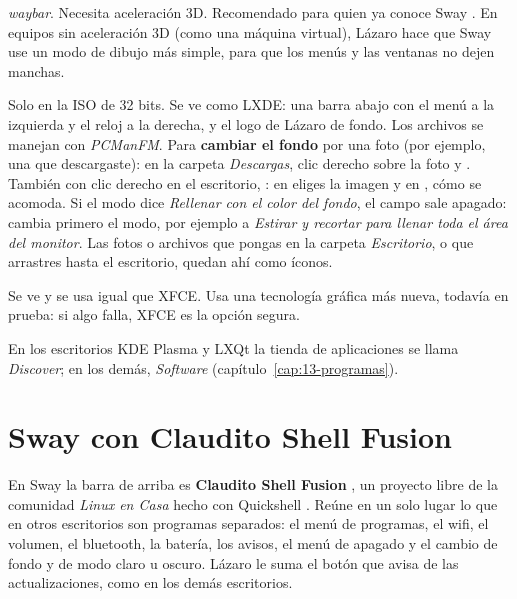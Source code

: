 \begin{description}
    \emph{waybar}.
    Necesita aceleración 3D. Recomendado para quien ya conoce Sway
    \cite{sway-wiki}. En equipos sin aceleración 3D (como una máquina
    virtual), Lázaro hace que Sway use un modo de dibujo más simple,
    para que los menús y las ventanas no dejen manchas.
  \item[IceWM] Solo en la ISO de 32 bits. Se ve como LXDE: una barra
    abajo con el menú a la izquierda y el reloj a la derecha, y el logo
    de Lázaro de fondo. Los archivos se manejan con \emph{PCManFM}.
    Para \textbf{cambiar el fondo} por una foto (por ejemplo, una que
    descargaste): en la carpeta \emph{Descargas}, clic derecho sobre la
    foto y . También con clic
    derecho en el escritorio, : en
     eliges la imagen y en , cómo se acomoda. Si el modo dice \emph{Rellenar con el
    color del fondo}, el campo  sale apagado: cambia primero
    el modo, por ejemplo a \emph{Estirar y recortar para llenar toda el área del monitor}. Las fotos o
    archivos que pongas en la carpeta \emph{Escritorio}, o que arrastres
    hasta el escritorio, quedan ahí como íconos.
  \item[XFCE Wayland] Se ve y se usa igual que XFCE. Usa una tecnología
    gráfica más nueva, todavía en prueba: si algo falla, XFCE es la opción
    segura.
\end{description}

\begin{nota}
En los escritorios KDE Plasma y LXQt la tienda de aplicaciones se llama
\emph{Discover}; en los demás, \emph{Software} (capítulo~\ref{cap:13-programas}).
\end{nota}

\section{Sway con Claudito Shell Fusion}\label{sec:claudito}

En Sway la barra de arriba es \textbf{Claudito Shell Fusion}
\cite{claudito-shell}, un proyecto libre de la comunidad \emph{Linux en
Casa} hecho con Quickshell \cite{quickshell}. Reúne en un solo lugar lo
que en otros escritorios son programas separados: el menú de programas,
el wifi, el volumen, el bluetooth, la batería, los avisos, el menú de
apagado y el cambio de fondo y de modo claro u oscuro. Lázaro le suma el
botón que avisa de las actualizaciones, como en los demás escritorios.

